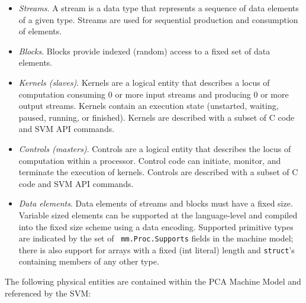 \begin{itemize}

\item {\it Streams}.  A stream is a data type that represents a
sequence of data elements of a given type.  Streams are used for
sequential production and consumption of elements.

\item {\it Blocks}. Blocks provide indexed (random) access to a fixed
set of data elements.

\item {\it Kernels (slaves)}. Kernels are a logical entity that
describes a locus of computation consuming 0 or more input streams and
producing 0 or more output streams.  Kernels contain an execution
state (unstarted, waiting, paused, running, or finished).  Kernels are
described with a subset of C code and SVM API commands.

\item {\it Controls (masters)}. Controls are a logical entity that
describes the locus of computation within a processor.  Control code
can initiate, monitor, and terminate the execution of kernels.
Controls are described with a subset of C code and SVM API commands.

\item {\it Data elements}. Data elements of streams and blocks must
have a fixed size.  Variable sized elements can be supported at the
language-level and compiled into the fixed size scheme using a data
encoding.  Supported primitive types are indicated by the set of {\tt
mm.Proc.Supports} fields in the machine model; there is also support
for arrays with a fixed (int literal) length and {\tt struct}'s
containing members of any other type.

\end{itemize}


The following physical entities are contained within the PCA Machine
Model and referenced by the SVM:

